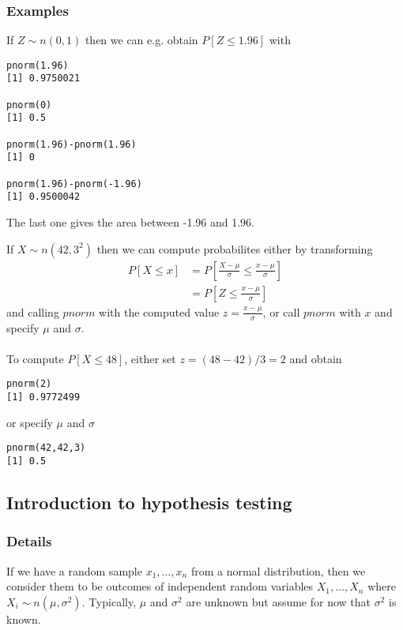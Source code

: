 \documentclass[12pt,a4paper]{article}
\theoremstyle{regla}
\theoremstyle{remark}
\theoremstyle{definition}
\theoremstyle{nonumberbreak}
\begin{document}
\subsubsection{Examples}
\begin{xmpl}
If $Z \sim n(0,1)$ then we can e.g. obtain $P[Z\leq1.96]$ with
\begin{lstlisting}
pnorm(1.96)
[1] 0.9750021

pnorm(0)
[1] 0.5

pnorm(1.96)-pnorm(1.96)
[1] 0

pnorm(1.96)-pnorm(-1.96)
[1] 0.9500042
\end{lstlisting}
The last one gives the area between -1.96 and 1.96.
\end{xmpl}
\begin{xmpl}
If $X \sim n(42,3^2)$ then we can compute probabilites either by transforming
\begin{align*}
P[X\leq x] &= P[\frac{X-\mu}{\sigma} \leq \frac{x-\mu}{\sigma}]\\
           &= P[Z \leq \frac{x-\mu}{\sigma}]
\end{align*}
and calling $pnorm$ with the computed value $z=\frac{x-\mu}{\sigma}$, or call $pnorm$ with $x$ and specify $\mu$ and $\sigma$.\\
\\
To compute $P[X\leq 48]$, either set $z=(48-42)/3=2$ and obtain\\
\begin{lstlisting}
pnorm(2)
[1] 0.9772499
\end{lstlisting}

or specify $\mu$ and $\sigma$

\begin{lstlisting}
pnorm(42,42,3)
[1] 0.5
\end{lstlisting}
\end{xmpl}



\subsection{Introduction to hypothesis testing}
\subsubsection{Details}
If we have a random sample $x_1, \ldots , x_n$ from a normal distribution, then we consider them to be outcomes of independent random variables $X_1, \ldots , X_n$ where $X_i \sim n(\mu, \sigma^2)$.
Typically, $\mu$ and $\sigma^2$ are unknown but assume for now that $\sigma^2$ is known.\\
\end{document}
